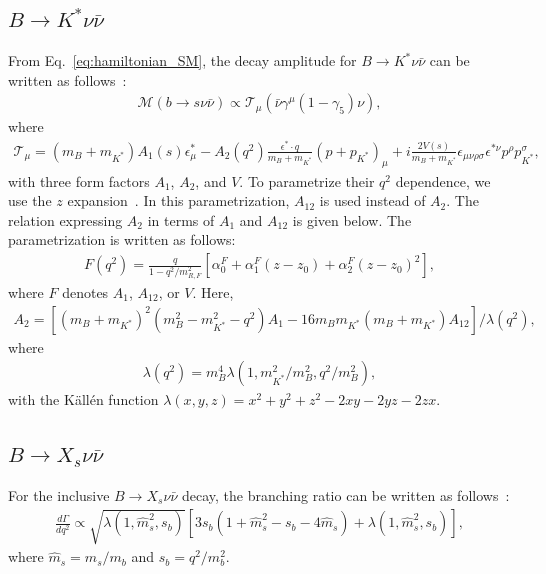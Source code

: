 \subsection{$B\rightarrow K^{*}\nu\bar{\nu}$}
From Eq.~\ref{eq:hamiltonian_SM}, the decay amplitude for $B\rightarrow K^{*}\nu\bar{\nu}$ can be written as follows~\cite{Ali:1999mm, Biancofiore:2014uba}:
\begin{align}
    \mathcal{M}(b\rightarrow s \nu \bar{\nu}) \propto \mathcal{T}_{\mu} \left( \bar{\nu} \gamma^{\mu}(1-\gamma_{5})\nu \right),
\end{align}
where
\begin{align}
    \label{eq:Kstaramp}
    \mathcal{T}_{\mu} = (m_B+m_{K^{*}})A_{1}(s)\epsilon^{*}_{\mu}-A_{2}(q^{2})\frac{\epsilon^{*} \cdot q}{m_{B}+m_{K^{*}}}(p+p_{K^{*}})_{\mu}+i\frac{2V(s)}{m_{B}+m_{K^{*}}}\epsilon_{\mu\nu\rho\sigma}\epsilon^{*\nu}p^{\rho}p^{\sigma}_{K^{*}},
\end{align}
with three form factors $A_{1}$, $A_{2}$, and $V$.
To parametrize their $q^{2}$ dependence, we use the $z$ expansion~\cite{Bharucha:2015bzk}.
In this parametrization, $A_{12}$ is used instead of $A_{2}$.
The relation expressing $A_{2}$ in terms of $A_{1}$ and $A_{12}$ is given below.
The parametrization is written as follows:
\begin{align}
    \label{eq:Kstarnunu_formfactor}
    F(q^{2}) = \frac{q}{1-q^{2}/m^{2}_{R,F}}\left[\alpha_{0}^{F} + \alpha_{1}^{F}(z-z_{0}) + \alpha_{2}^{F}(z-z_{0})^{2} \right],
\end{align}
where $F$ denotes $A_{1}$, $A_{12}$, or $V$. Here,
\begin{align}
    A_{2} = \left[(m_{B}+m_{K^{*}})^{2}(m_{B}^{2}-m_{K^{*}}^{2}-q^{2})A_{1}-16m_{B}m_{K^{*}}(m_{B}+m_{K^{*}})A_{12} \right]/\lambda(q^{2}),
\end{align}
where
\begin{align}
    \lambda(q^{2})=m_{B}^{4}\lambda(1,m^{2}_{K^{*}}/m^{2}_{B},q^{2}/m^{2}_{B}),
\end{align}
with the Källén function $\lambda(x,y,z) = x^{2} + y^{2} + z^{2} - 2xy -2yz -2zx$.
\subsection{$B\rightarrow X_{s}\nu\bar{\nu}$}
For the inclusive $B\rightarrow X_{s} \nu \bar{\nu}$ decay, the branching ratio can be written as follows~\cite{Altmannshofer:2009ma}:
\begin{align}
  \frac{d\Gamma}{dq^{2}} \propto \sqrt{\lambda(1,\hat{m}^2_s,s_b)}\left[3s_{b}(1+\hat{m}^{2}_{s}-s_{b}-4\hat{m}_{s})+\lambda(1,\hat{m}_{s}^{2},s_{b}) \right],
  \label{eq:Xsamp}
\end{align}
where $\hat{m}_s=m_{s}/m_{b}$ and $s_{b}=q^{2}/m_{b}^{2}$.

